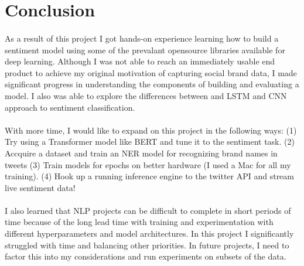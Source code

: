 \documentclass{article}
\begin{document}
\section{Conclusion}

\paragraph{} As a result of this project I got hands-on experience learning how to build a sentiment model using some of the prevalant opensource libraries available for deep learning. Although I was not able to reach an immediately usable end product to achieve my original motivation of capturing social brand data, I made significant progress in understanding the components of building and evaluating a model. I also was able to explore the differences between and LSTM and CNN approach to sentiment classification.

\paragraph{} With more time, I would like to expand on this project in the following ways: (1) Try using a Transformer model like BERT and tune it to the sentiment task. (2) Accquire a dataset and train an NER model for recognizing brand names in tweets (3) Train models for epochs on better hardware (I used a Mac for all my training). (4) Hook up a running inference engine to the twitter API and stream live sentiment data!

\paragraph{} I also learned that NLP projects can be difficult to complete in short periods of time because of the long lead time with training and experimentation with different hyperparameters and model architectures. In this project I significantly struggled with time and balancing other priorities. In future projects, I need to factor this into my considerations and run experiments on subsets of the data.
\end{document}
